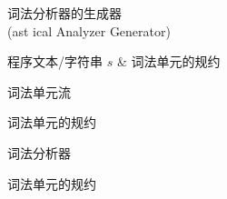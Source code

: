
\begin{frame}{}
  \begin{center}
    词法分析器的生成器 \\[5pt]
    (ast ical Analyzer Generator)
  \end{center}
\end{frame}

\begin{frame}{}
  \begin{center}
     程序文本/字符串 $s$ \& 词法单元的规约

    \vspace{0.50cm}

    \vspace{0.30cm}
     词法单元流
  \end{center}
\end{frame}

\begin{frame}{}
  \begin{center}
     词法单元的规约

    \vspace{0.50cm}

    \vspace{0.30cm}
     词法分析器
  \end{center}
\end{frame}

\begin{frame}{}
  \begin{center}
    词法单元的规约

    \vspace{0.40cm}
    \begin{columns}
    \end{columns}

    \vspace{0.60cm}
  \end{center}
\end{frame}

